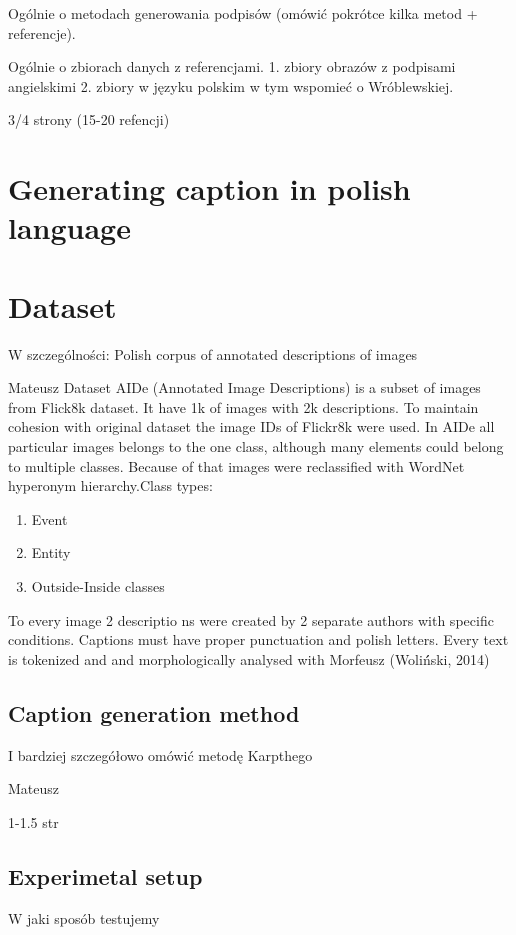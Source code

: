\documentclass[runningheads]{llncs}
\begin{document}
Ogólnie o metodach generowania podpisów (omówić pokrótce kilka metod + referencje). 

Ogólnie o zbiorach danych z referencjami. 1. zbiory obrazów z podpisami angielskimi 2. zbiory w języku polskim w tym wspomieć o Wróblewskiej. 

3/4 strony (15-20 refencji)

\section{Generating caption in polish language}

\section{Dataset}
W szczególności: Polish corpus of annotated descriptions of images

Mateusz
Dataset AIDe (Annotated Image Descriptions) is a subset of images from Flick8k dataset. It have 1k of images with 2k descriptions. To maintain cohesion with original dataset the image IDs of Flickr8k were used. In AIDe all particular images belongs to the one class, although many elements could belong to multiple classes. Because of that images were reclassified with WordNet hyperonym hierarchy.Class types:
\begin{enumerate}
    \item Event
    \item Entity
    \item Outside-Inside classes
\end{enumerate}
To every image 2 descriptio
ns were created by 2 separate authors with specific conditions. Captions must have proper punctuation and polish letters. Every text is tokenized and and morphologically analysed with Morfeusz (Woliń́ski, 2014)

\subsection{Caption generation method} 
\cite{Karpathy2017}
I bardziej szczegółowo omówić metodę Karpthego

Mateusz

1-1.5 str

\subsection{Experimetal setup}

W jaki sposób testujemy
\end{document}
